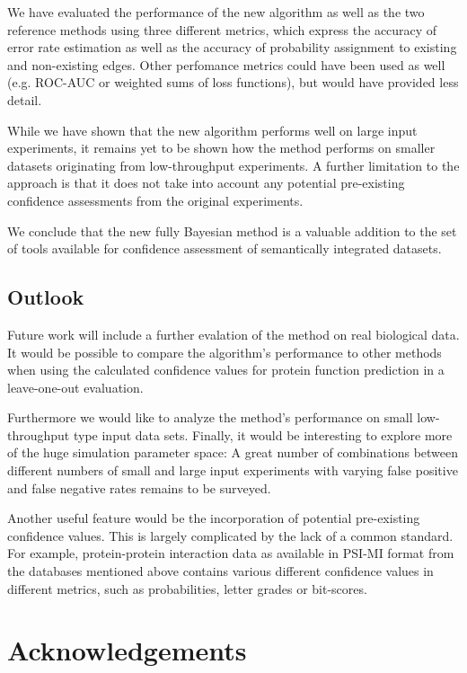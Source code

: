 \documentclass{bioinfo}
\begin{document}
We have evaluated the performance of the new algorithm as well as the two reference methods using three different metrics, which express the accuracy of error rate estimation as well as the accuracy of probability assignment to existing and non-existing edges. Other perfomance metrics could have been used as well (e.g. ROC-AUC or weighted sums of loss functions), but would have provided less detail.

While we have shown that the new algorithm performs well on large input experiments, it remains yet to be shown how the method performs on smaller datasets originating from low-throughput experiments. A further limitation to the approach is that it does not take into account any potential pre-existing confidence assessments from the original experiments.

We conclude that the new fully Bayesian method is a valuable addition to the set of tools available for confidence assessment of semantically integrated datasets.

\subsection{Outlook}

Future work will include a further evalation of the method on real biological data. It would be possible to compare the algorithm's performance to other methods when using the calculated confidence values for protein function prediction in a leave-one-out evaluation.

Furthermore we would like to analyze the method's performance on small low-throughput type input data sets. Finally, it would be interesting to explore more of the huge simulation parameter space: A great number of combinations between different numbers of small and large input experiments with varying false positive and false negative rates remains to be surveyed.

Another useful feature would be the incorporation of potential pre-existing confidence values. This is largely complicated by the lack of a common standard. For example, protein-protein interaction data as available in PSI-MI format from the databases mentioned above contains various different confidence values in different metrics, such as probabilities, letter grades or bit-scores.

\section*{Acknowledgements}
\end{document}
